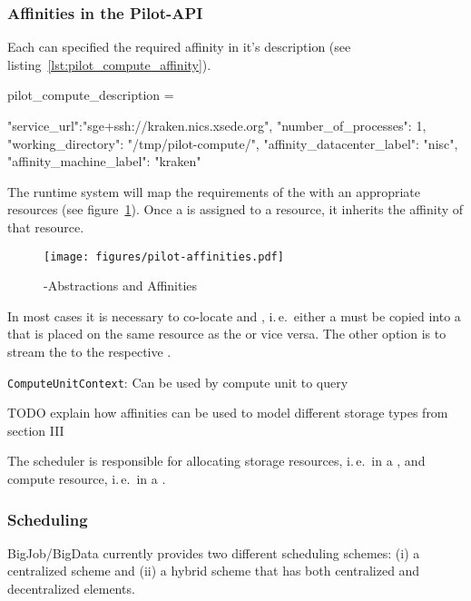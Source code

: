 \documentclass{sig-alternate}
\begin{document}
\subsubsection*{Affinities in the Pilot-API}


Each \pilot can specified the required affinity in it's description (see
listing~\ref{lst:pilot_compute_affinity}).

\begin{code}[
caption={Creation of a \textit{PilotCompute} on the specified  compute
resource endpoint.},
label={lst:pilot_compute_affinity}]
pilot_compute_description = 

{
 "service_url":"sge+ssh://kraken.nics.xsede.org",
 "number_of_processes": 1,                             
 "working_directory": "/tmp/pilot-compute/",
 "affinity_datacenter_label": "nisc",              
 "affinity_machine_label": "kraken" 
}
\end{code}

The runtime system will map the requirements of the \pilot with an appropriate
resources (see figure~\ref{fig:figures_pilot-affinities}). Once a \pilot is
assigned to a resource, it inherits the affinity of that resource.

\begin{figure}[t]
	\centering
	\texttt{[image: figures/pilot-affinities.pdf]}
	\caption{\pilot-Abstractions and Affinities}
	\label{fig:figures_pilot-affinities}
\end{figure}


In most cases it is necessary to co-locate \cus and \dus, i.\,e.\ either a \du
must be copied into a \pd that is placed on the same resource as the \pj or
vice versa. The other option is to stream the \du to the respective \cu.


\texttt{ComputeUnitContext}: Can be used by compute unit to query


TODO
explain how affinities can be used to model different storage types from 
section III

The scheduler is responsible for allocating storage resources, i.\,e.\ \sus in a \pilotdata, and compute resource, i.\,e.\ \sus in a \pilotcompute.


\subsubsection*{Scheduling}

BigJob/BigData currently provides two different scheduling schemes: (i) a 
centralized scheme and (ii) a hybrid scheme that has both centralized and 
decentralized elements.
\end{document}
